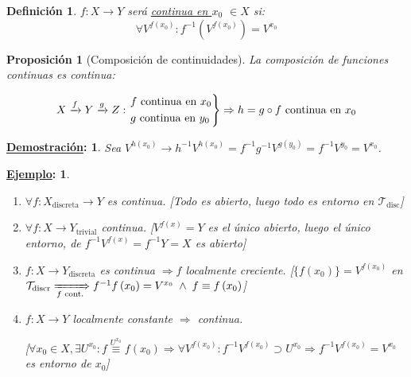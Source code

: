 \documentclass[10pt,a4paper,openright]{book}
\theoremstyle{break}
\newtheorem*{defi}{Definición}
\newtheorem*{prop}{Proposición}
\newtheorem*{demo}{\underline{Demostración}:}
\newtheorem*{ej}{\underline{Ejemplo}:}
\begin{document}
\begin{defi}
$f: X \rightarrow Y$ será \underline{continua en $x_0$} $\in X$ si: 
\[
\forall V^{f\left( x_0 \right)}: f^{-1}\left( V^{f\left( x_0 \right)} \right) = V^{x_0} 
\]
\end{defi}

\begin{prop}[Composición de continuidades]
La composición de funciones continuas es continua:

\[
X \xrightarrow{f} Y \xrightarrow{g} Z: \begin{rcases}
    f \text{ continua en } x_0\\
    g \text{ continua en } y_0
\end{rcases} \Rightarrow h = g \circ f \text{ continua en }  x_0
\]
\end{prop}
\begin{demo}
Sea $V^{h\left( x_0 \right)} \rightarrow h^{-1} V^{h\left( x_0 \right)} = f^{-1}g^{-1}V^{g\left( y_0 \right)} = f^{-1} V^{y_0} = V^{x_0}$.
\end{demo}

\begin{ej}
\begin{enumerate}
    \item $\forall f: X_{\text{discreta}} \rightarrow Y$ es continua. [Todo es abierto, luego todo es entorno en $\mathcal{T}_{\text{disc}}$]
    \item $\forall f: X \rightarrow Y_{\text{trivial}}$ continua. [$V^{f\left( x \right)} = Y$ es el único abierto, luego el único entorno, de $f^{-1}V^{f\left( x \right)} = f^{-1}Y = X$ es abierto]
    \item $f: X \rightarrow Y_{\text{discreta}}$ es continua $\Rightarrow f$ localmente creciente.
        [$\{f\left( x_0 \right)\} = V^{f\left( x_0 \right)}$ en $\mathcal{T}_{\text{discr}} \xRightarrow[f\text{ cont.}]{} f^{-1}f\left( x_0 \right) = V^{x_0}\; \land \;f \equiv f\left( x_0 \right)$]
    \item $f: X \rightarrow Y$ localmente constante $\Rightarrow$ continua.

    [$\forall x_0 \in X, \exists U^{x_0} : f \stackrel{U^{x_0}}{\equiv} f\left( x_0 \right) \Rightarrow \forall V^{f\left( x_0 \right)}: f^{-1}V^{f\left( x_0 \right)} \supset U^{x_0} \Rightarrow f^{-1}V^{f\left( x_0 \right)} = V^{x_0}$ es entorno de $x_0$]
\end{enumerate}
\end{ej}
\end{document}
